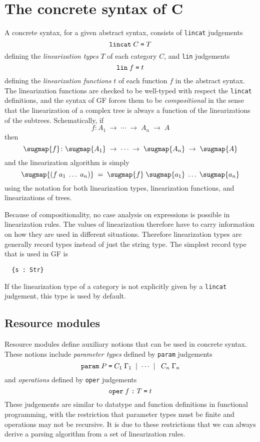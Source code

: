 \documentclass[12pt]{article}
\newcommand{\empha}[1]{{\em #1}}
\newcommand{\rarrow}{\; \rightarrow\;}
\begin{document}
\section{The concrete syntax of C}

A concrete syntax, for a given abstract syntax, 
consists of \texttt{lincat} judgements
\[
\mbox{\texttt{lincat}} \; C \; \mbox{\texttt{=}} \; T
\]
defining the \empha{linearization types} $T$ of each category $C$,
and \texttt{lin} judgements
\[
\mbox{\texttt{lin}} \; f \; \mbox{\texttt{=}} \; t
\]
defining the \empha{linearization functions} $t$ of each function $f$
in the abstract syntax. The linearization functions are
checked to be well-typed with respect the \texttt{lincat}
definitions, and the syntax of GF forces them to be \empha{compositional}
in the sense that the linearization of a complex tree is always
a function of the linearizations of the subtrees. Schematically, if
\[
  f \colon A_{1} \rarrow \cdots \rarrow A_{n} \rarrow A 
\]
then
\[
  \sugmap{f} \colon 
    \sugmap{A_{1}} \rarrow \cdots 
    \rarrow \sugmap{A_{n}} \rarrow \sugmap{A} 
\]
and the linearization algorithm is simply
\[
  \sugmap{(f \; a_{1} \; \ldots \; a_{n})} \; = \;
   \sugmap{f} \; \sugmap{a_{1}} \; \ldots \; \sugmap{a_{n}}
\]
using the \sugmap{} notation for both linearization types, 
linearization functions, and linearizations of trees.

Because of compositionality, no case analysis on expressions
is possible in linearization rules. The values of linearization
therefore have to carry information on how they are used in
different situations. Therefore linearization
types are generally record types instead of just the string type.
The simplest record type that is used in GF is
\begin{verbatim}
  {s : Str}
\end{verbatim}
If the linearization type of a category is not explicitly
given by a \texttt{lincat} judgement, this type is
used by default. 



\subsection{Resource modules}

Resource modules define auxiliary notions that can be
used in concrete syntax. These notions include
\empha{parameter types} defined by \texttt{param}
judgements
\[
\mbox{\texttt{param}} \; P \; \mbox{\texttt{=}} 
  \; C_{1} \; \Gamma_{1} \; \mid \; \cdots \; \mid \; 
  \; C_{n} \; \Gamma_{n}
\]
and \empha{operations} defined by
\texttt{oper} judgements
\[
\mbox{\texttt{oper}} \; f \; \mbox{\texttt{:}} \; T \; \mbox{\texttt{=}} \; t
\]
These judgements are
similar to datatype and function definitions
in functional programming, with the restriction
that parameter types must be finite and operations
may not be recursive. It is due to these restrictions that
we can always derive a parsing algorithm from a set of
linearization rules.
\end{document}
